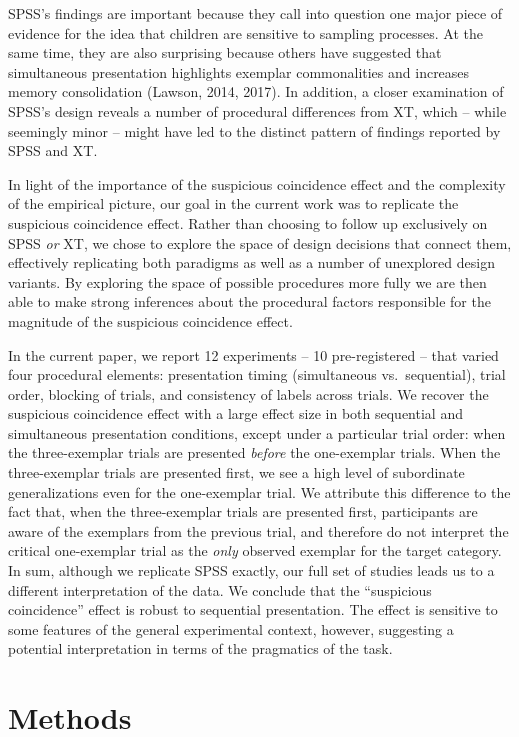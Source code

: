 \documentclass[english,floatsintext,man]{apa6}
\theoremstyle{definition}
\theoremstyle{definition}
\theoremstyle{definition}
\theoremstyle{remark}
\begin{document}
SPSS's findings are important because they call into question one major
piece of evidence for the idea that children are sensitive to sampling
processes. At the same time, they are also surprising because others
have suggested that simultaneous presentation highlights exemplar
commonalities and increases memory consolidation (Lawson, 2014, 2017).
In addition, a closer examination of SPSS's design reveals a number of
procedural differences from XT, which -- while seemingly minor -- might
have led to the distinct pattern of findings reported by SPSS and XT.

In light of the importance of the suspicious coincidence effect and the
complexity of the empirical picture, our goal in the current work was to
replicate the suspicious coincidence effect. Rather than choosing to
follow up exclusively on SPSS \emph{or} XT, we chose to explore the
space of design decisions that connect them, effectively replicating
both paradigms as well as a number of unexplored design variants. By
exploring the space of possible procedures more fully we are then able
to make strong inferences about the procedural factors responsible for
the magnitude of the suspicious coincidence effect.

In the current paper, we report 12 experiments -- 10 pre-registered --
that varied four procedural elements: presentation timing (simultaneous
vs.~sequential), trial order, blocking of trials, and consistency of
labels across trials. We recover the suspicious coincidence effect with
a large effect size in both sequential and simultaneous presentation
conditions, except under a particular trial order: when the
three-exemplar trials are presented \emph{before} the one-exemplar
trials. When the three-exemplar trials are presented first, we see a
high level of subordinate generalizations even for the one-exemplar
trial. We attribute this difference to the fact that, when the
three-exemplar trials are presented first, participants are aware of the
exemplars from the previous trial, and therefore do not interpret the
critical one-exemplar trial as the \emph{only} observed exemplar for the
target category. In sum, although we replicate SPSS exactly, our full
set of studies leads us to a different interpretation of the data. We
conclude that the \enquote{suspicious coincidence} effect is robust to
sequential presentation. The effect is sensitive to some features of the
general experimental context, however, suggesting a potential
interpretation in terms of the pragmatics of the task.

\section{Methods}\label{methods}
\end{document}
